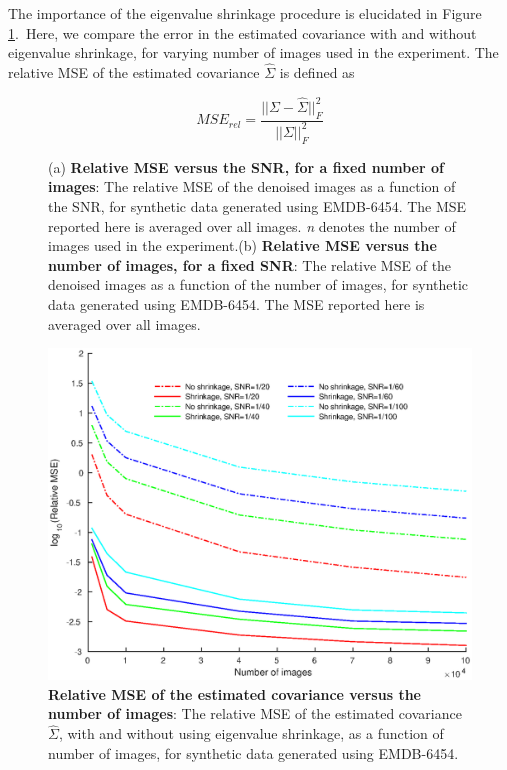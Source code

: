 \documentclass[review]{elsarticle}
\begin{document}
The importance of the eigenvalue shrinkage procedure is elucidated in Figure \ref{fig:shrinkage}.\ Here,
we compare the error in the estimated covariance with and without eigenvalue shrinkage, for 
varying number of images used in the experiment. The relative MSE of the estimated covariance $\hat{\Sigma}$ is defined as

\begin{equation}
 MSE_{rel} = \frac{||\Sigma-\hat{\Sigma}||_F^2}{||\Sigma||_F^2}
\end{equation}

\begin{figure}[]
\centering
{}
\caption{(a) \textbf{Relative MSE versus the SNR, for a fixed number of images}: 
The 
relative MSE of the denoised images as a function of the SNR, for synthetic 
data 
generated using EMDB-6454. The 
MSE reported here is averaged over all images. \textit{n} denotes the number of images 
used in the experiment.(b) \textbf{Relative MSE versus the number of images, for a fixed SNR}: 
The 
relative MSE of the denoised images as a function of the number of images, for 
synthetic data generated using EMDB-6454. The 
MSE reported here is averaged over all images. }
\end{figure}


\begin{figure}
\centering

\includegraphics[width=0.8\linewidth]{cwf_shrinkage_compare.eps}

\caption{\textbf{Relative MSE of the estimated covariance versus the number of images}: 
The 
relative MSE of the estimated covariance $\hat\Sigma$, with and without using eigenvalue shrinkage, as a function of number 
of images, for synthetic 
data 
generated using EMDB-6454.}
\label{fig:shrinkage}
\end{figure}
\end{document}
